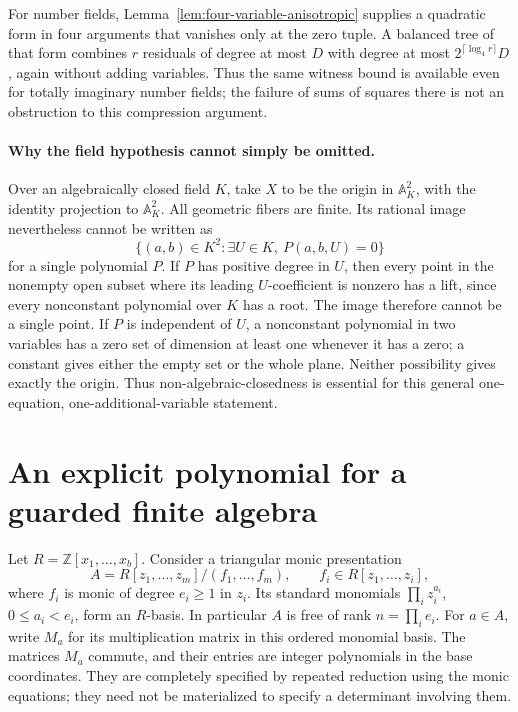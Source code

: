 \documentclass[11pt]{article}
\theoremstyle{definition}
\begin{document}
For number fields, Lemma~\ref{lem:four-variable-anisotropic} supplies
a quadratic form in four arguments that vanishes only at the zero
tuple. A balanced tree of that form combines $r$ residuals of degree
at most $D$ with degree at most $2^{\lceil\log_4 r\rceil}D$, again
without adding variables. Thus the same witness bound is available
even for totally imaginary number fields; the failure of sums of
squares there is not an obstruction to this compression argument.

\paragraph{Why the field hypothesis cannot simply be omitted.}
Over an algebraically closed field $K$, take $X$ to be the origin in
$\mathbb A^2_K$, with the identity projection to $\mathbb A^2_K$.
All geometric fibers are finite. Its rational image nevertheless
cannot be written as
\[
 \{(a,b)\in K^2:\exists U\in K,\ P(a,b,U)=0\}
\]
for a single polynomial $P$. If $P$ has positive degree in $U$,
then every point in the nonempty open subset where its leading
$U$-coefficient is nonzero has a lift, since every nonconstant
polynomial over $K$ has a root. The image therefore cannot be a
single point. If $P$ is independent of $U$, a nonconstant polynomial
in two variables has a zero set of dimension at least one whenever
it has a zero; a constant gives either the empty set or the whole
plane. Neither possibility gives exactly the origin. Thus
non-algebraic-closedness is essential for this general one-equation,
one-additional-variable statement.


\section{An explicit polynomial for a guarded finite algebra}
\label{sec:explicit-finite-algebra}

Let $R=\mathbb Z[x_1,\ldots,x_b]$. Consider a triangular monic presentation
\[
 A=R[z_1,\ldots,z_m]/(f_1,\ldots,f_m),\qquad
 f_i\in R[z_1,\ldots,z_i],
\]
where $f_i$ is monic of degree $e_i\ge1$ in $z_i$. Its standard
monomials $\prod_i z_i^{a_i}$, $0\le a_i<e_i$, form an $R$-basis.
In particular $A$ is free of rank $n=\prod_i e_i$. For $a\in A$,
write $M_a$ for its multiplication matrix in this ordered monomial basis.
The matrices $M_a$ commute, and their entries are integer polynomials in
the base coordinates. They are completely specified by repeated reduction
using the monic equations; they need not be materialized to specify a
determinant involving them.
\end{document}
